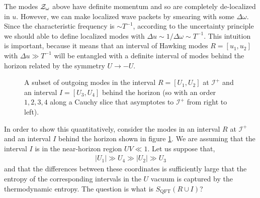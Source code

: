 \documentclass[12pt]{article}
\newcommand{\EQ}[1]{\begin{equation}\begin{split} #1
\end{split}\end{equation}}
\begin{document}
The modes ${\cal Z}_\omega$ above have definite  momentum and so are completely de-localized in $u$. However, we can make  localized wave packets  by smearing with some $\Delta\omega$. Since the characteristic frequency is $\sim T^{-1}$, according to the uncertainty principle we should able to define localized modes with $\Delta u\sim 1/\Delta\omega\sim T^{-1}$. This intuition is important, because it means that an interval of Hawking modes $R=[u_1,u_2]$ with $\Delta u\gg T^{-1}$ will be entangled with a definite interval of modes behind the horizon related by the symmetry $U\to-U$. 
\begin{figure}[ht]
\begin{center}
\caption{\footnotesize A subset of outgoing modes in the interval $R=[U_1,U_2]$ at $\mathscr I^+$ and an interval $I=[U_3,U_4]$ behind the horizon (so with an order $1,2,3,4$ along a Cauchy slice that asymptotes to $\mathscr I^+$ from right to left).}
\label{fig3} 
\end{center}
\end{figure}
In order to show this quantitatively, consider the modes in an interval $R$ at $\mathscr I^+$ and an interval $I$ behind the horizon shown in figure \ref{fig3}. We are assuming that the interval $I$ is in the near-horizon region $UV\ll1$. Let us suppose that,
\EQ{
|U_1|\gg U_4\gg|U_2|\gg U_3
\label{vef}
}
and that the differences between these coordinates is  sufficiently large that the entropy of the corresponding intervals in the $U$ vacuum is captured by the thermodynamic entropy. The question is what is $S_\text{QFT}(R\cup I)$? 
\end{document}
